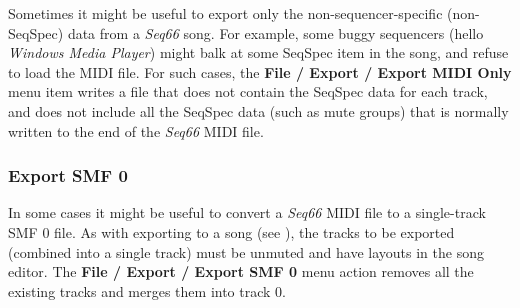   Sometimes it might be useful to export only the non-sequencer-specific
   (non-SeqSpec) data from a \textsl{Seq66} song.
   For example, some buggy sequencers
   (hello \textsl{Windows Media Player})
   might balk at some SeqSpec item in the song, and refuse to load the MIDI
   file.
   For such cases,
   the \textbf{File / Export / Export MIDI Only} menu
   item writes a file that does not contain
   the SeqSpec data for each track, and does not include all the SeqSpec data
   (such as mute groups) that is normally written to the end of the
   \textsl{Seq66} MIDI file.

\subsubsection{Export SMF 0}
\label{subsubsec:midi_export_file_export_smf_0}

   In some cases it might be useful to convert a \textsl{Seq66} MIDI file to a
   single-track SMF 0 file.
   As with exporting to a song
   (see ),
   the tracks to be exported (combined into a single track) must be unmuted
   and have layouts in the song editor.
   The \textbf{File / Export / Export SMF 0 } menu
   action removes all the existing tracks and merges them into track 0.

